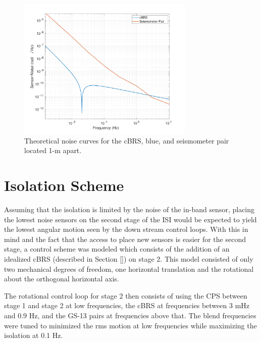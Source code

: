 \documentclass [12pt, proquest]{uwthesis}[2019]
\begin{document}
\begin{figure}%
\begin{center}
\includegraphics[width=0.75\textwidth]{SensorNoise.pdf}
\caption{Theoretical noise curves for the cBRS, blue, and seismometer pair located 1-m apart.}
\label{sensNoise}
\end{center}
\end{figure}

\section{Isolation Scheme} \label{IsoScheme}

Assuming that the isolation is limited by the noise of the in-band sensor, placing the lowest noise sensors on the second stage of the ISI would be expected to yield the lowest angular motion seen by the down stream control loops. With this in mind and the fact that the access to place new sensors is easier for the second stage, a control scheme was modeled which consists of the addition of an idealized cBRS (described in Section \ref{}) on stage 2. This model consisted of only two mechanical degrees of freedom, one horizontal translation and the rotational about the orthogonal horizontal axis.

The rotational control loop for stage 2 then consists of using the CPS between stage 1 and stage 2 at low frequencies, the cBRS at frequencies between 3 mHz and 0.9 Hz, and the GS-13 pairs at frequencies above that. The blend frequencies were tuned to minimized the rms motion at low frequencies while maximizing the isolation at 0.1 Hz. 
\end{document}
